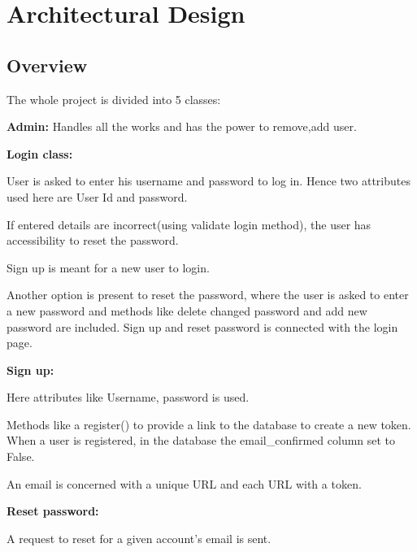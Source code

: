 \documentclass[11pt, english]{article}
\begin{document}
\section{Architectural Design}
\newline
\subsection{Overview}
\newline
The whole project is divided into 5 classes:
\newline
\item\textbf{Admin:}
\newline
\newline Handles all the works and has the power to remove,add user.
\newline
\item\textbf{Login class:}
\item\item User is asked to enter his username and password to log in. Hence two attributes used here are User Id and password.
\item\item If entered details are incorrect(using validate login method), the user has accessibility to reset the password. 
\item\item Sign up is meant for a new user to login.
\item\item Another option is present to reset the password, where the user is asked to enter a new password and methods like delete changed password and add new password are included. Sign up and reset password is connected with the login page.
\newline
\item\textbf{Sign up:}
\item\item Here attributes like Username, password is used.
\item\item Methods like a register() to provide a link to the database to create a new token. When a user is registered, in the database the email_confirmed column set to False.
\item\item An email is concerned with a unique URL and each URL with a token.
\newline
\item\textbf{Reset password:}
\item\item A request to reset for a given account's email is sent.
\end{document}

